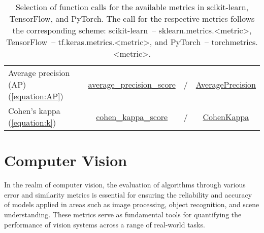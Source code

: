 \documentclass{article}
\begin{document}
\begin{table}[H]
{\begin{tabular}{|l|c|c|c|}
		Average precision (AP) (\ref{equation:AP})
		&
		\href{https://scikit-learn.org/stable/modules/generated/sklearn.metrics.average_precision_score.html\#sklearn.metrics.average_precision_score}{average\_precision\_score}
		&
		/
		&
		\href{https://torchmetrics.readthedocs.io/en/latest/classification/average_precision.html}{AveragePrecision}
		\\

		Cohen's kappa (\ref{equation:k})
		&
		\href{https://scikit-learn.org/stable/modules/generated/sklearn.metrics.cohen_kappa_score.html\#sklearn.metrics.cohen_kappa_score}{cohen\_kappa\_score}
		&
		/
		&
		\href{https://torchmetrics.readthedocs.io/en/latest/classification/cohen_kappa.html}{CohenKappa}
		\\

		\hline
	\end{tabular}}

	\caption{Selection of function calls for the available metrics in scikit-learn, TensorFlow, and PyTorch. The call for the respective metrics follows the corresponding scheme: scikit-learn~-- sklearn.metrics.<metric>, TensorFlow~-- tf.keras.metrics.<metric>, and PyTorch~-- torchmetrics.<metric>.}
	\label{table:ML_functions}
\end{table}




\clearpage




\section{Computer Vision}

In the realm of computer vision, the evaluation of algorithms through various error and similarity metrics is essential for ensuring the reliability and accuracy of models applied in areas such as image processing, object recognition, and scene understanding. These metrics serve as fundamental tools for quantifying the performance of vision systems across a range of real-world tasks.
\end{document}
